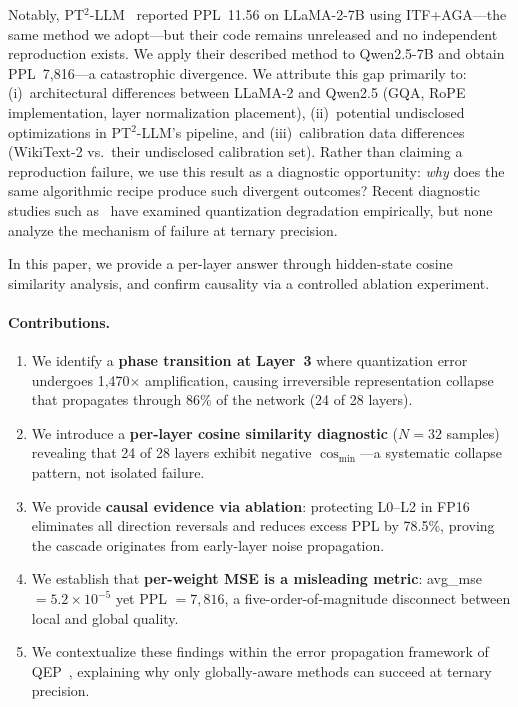 \documentclass[10pt,a4paper]{article}
\begin{document}
Notably, PT$^2$-LLM~\citep{pt2llm2025} reported PPL~11.56 on LLaMA-2-7B using ITF+AGA---the same method we adopt---but their code remains unreleased and no independent reproduction exists.
We apply their described method to Qwen2.5-7B and obtain PPL~7,816---a catastrophic divergence.
We attribute this gap primarily to: (i)~architectural differences between LLaMA-2 and Qwen2.5 (GQA, RoPE implementation, layer normalization placement), (ii)~potential undisclosed optimizations in PT$^2$-LLM's pipeline, and (iii)~calibration data differences (WikiText-2 vs.\ their undisclosed calibration set).
Rather than claiming a reproduction failure, we use this result as a diagnostic opportunity: \textit{why} does the same algorithmic recipe produce such divergent outcomes?
Recent diagnostic studies such as~\citet{qwen3quant2025} have examined quantization degradation empirically, but none analyze the mechanism of failure at ternary precision.

In this paper, we provide a per-layer answer through hidden-state cosine similarity analysis, and confirm causality via a controlled ablation experiment.

\paragraph{Contributions.}
\begin{enumerate}
    \item We identify a \textbf{phase transition at Layer~3} where quantization error undergoes 1,470$\times$ amplification, causing irreversible representation collapse that propagates through 86\% of the network (24 of 28 layers).
    \item We introduce a \textbf{per-layer cosine similarity diagnostic} ($N{=}32$ samples) revealing that 24 of 28 layers exhibit negative $\cos_{\min}$---a systematic collapse pattern, not isolated failure.
    \item We provide \textbf{causal evidence via ablation}: protecting L0--L2 in FP16 eliminates all direction reversals and reduces excess PPL by 78.5\%, proving the cascade originates from early-layer noise propagation.
    \item We establish that \textbf{per-weight MSE is a misleading metric}: avg\_mse $= 5.2 \times 10^{-5}$ yet PPL $= 7{,}816$, a five-order-of-magnitude disconnect between local and global quality.
    \item We contextualize these findings within the error propagation framework of QEP~\citep{qep2025}, explaining why only globally-aware methods can succeed at ternary precision.
\end{enumerate}
\end{document}

